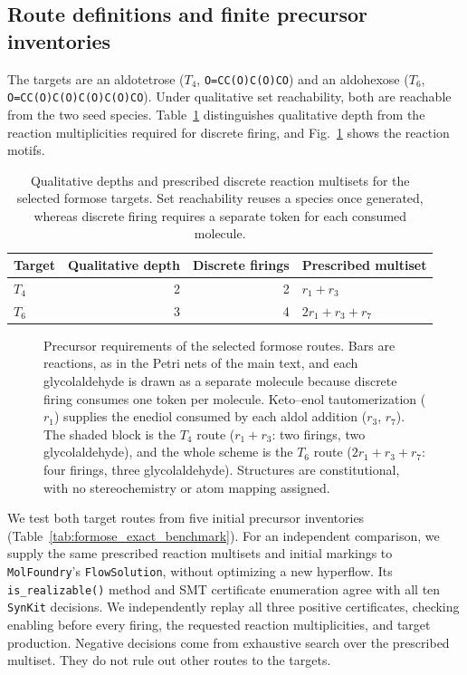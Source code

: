 \documentclass[10pt,a4paper,fleqn]{article}
\theoremstyle{plain}\newtheorem{theorem}{Theorem}
\newcommand{\synkit}{\texttt{SynKit}\xspace}
\begin{document}
\subsection{Route definitions and finite precursor inventories}

The targets are an aldotetrose ($T_4$, \texttt{O=CC(O)C(O)CO}) and an aldohexose ($T_6$, \texttt{O=CC(O)C(O)C(O)C(O)CO}). Under qualitative set reachability, both are reachable from the two seed species. Table~\ref{tab:formose_routes} distinguishes qualitative depth from the reaction multiplicities required for discrete firing, and Fig.~\ref{fig:formose_reaction_motifs} shows the reaction motifs.

\begin{table}[htbp]
\centering
\caption{Qualitative depths and prescribed discrete reaction multisets for the selected formose targets. Set reachability reuses a species once generated, whereas discrete firing requires a separate token for each consumed molecule.}
\label{tab:formose_routes}
\begin{tabular*}{\linewidth}{@{\extracolsep{\fill}}lrrl@{}}
\toprule
Target & Qualitative depth & Discrete firings & Prescribed multiset \\
\midrule
$T_{4}$ & 2 & 2 & $r_{1}+r_{3}$ \\
$T_{6}$ & 3 & 4 & $2r_{1}+r_{3}+r_{7}$ \\
\bottomrule
\end{tabular*}
\end{table}

\begin{figure}[!htbp]
\centering

    \caption{Precursor requirements of the selected formose routes. Bars are reactions, as in the Petri nets of the main text, and each glycolaldehyde is drawn as a separate molecule because discrete firing consumes one token per molecule. Keto--enol tautomerization ($r_1$) supplies the enediol consumed by each aldol addition ($r_3$, $r_7$). The shaded block is the $T_4$ route ($r_1+r_3$: two firings, two glycolaldehyde), and the whole scheme is the $T_6$ route ($2r_1+r_3+r_7$: four firings, three glycolaldehyde). Structures are constitutional, with no stereochemistry or atom mapping assigned.}
\label{fig:formose_reaction_motifs}
\end{figure}

We test both target routes from five initial precursor inventories (Table~\ref{tab:formose_exact_benchmark}). For an independent comparison, we supply the same prescribed reaction multisets and initial markings to \texttt{MolFoundry}'s \texttt{FlowSolution}, without optimizing a new hyperflow. Its \texttt{is\_realizable()} method and SMT certificate enumeration agree with all ten \synkit decisions. We independently replay all three positive certificates, checking enabling before every firing, the requested reaction multiplicities, and target production. Negative decisions come from exhaustive search over the prescribed multiset. They do not rule out other routes to the targets.
\end{document}
